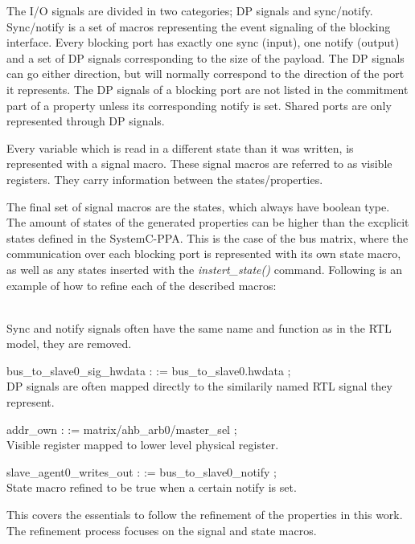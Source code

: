 The I/O signals are divided in two categories; DP signals and sync/notify. Sync/notify is a set of macros representing the event signaling of the blocking interface. Every blocking port has exactly one sync (input), one notify (output) and a set of DP signals corresponding to the size of the payload. The DP signals can go either direction, but will normally correspond to the direction of the port it represents. The DP signals of a blocking port are not listed in the commitment part of a property unless its corresponding notify is set. Shared ports are only represented through DP signals.\par
Every variable which is read in a different state than it was written, is represented with a signal macro. These signal macros are referred to as visible registers. They carry information between the states/properties. \par
The final set of signal macros are the states, which always have boolean type. The amount of states of the generated properties can be higher than the excplicit states defined in the SystemC-PPA. This is the case of the bus matrix, where the communication over each blocking port is represented with its own state macro, as well as any states inserted with the \textit{instert\_state()} command. Following is an example of how to refine each of the described macros: \par
{} \\ 
Sync and notify signals often have the same name and function as in the RTL model, they are removed. \par
{} bus\_to\_slave0\_sig\_hwdata :  := bus\_to\_slave0.hwdata ; \\
DP signals are often mapped directly to the similarily named RTL signal they represent. \par
{} addr\_own :  := matrix/ahb\_arb0/master\_sel ; \\
Visible register mapped to lower level physical register. \par
{} slave\_agent0\_writes\_out :  := bus\_to\_slave0\_notify ; \\
State macro refined to be true when a certain notify is set. \par
This covers the essentials to follow the refinement of the properties in this work. The refinement process focuses on the signal and state macros. 

